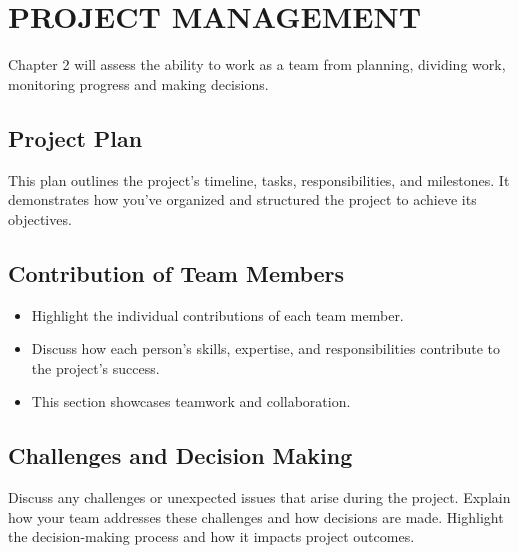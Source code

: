 

\chapter{PROJECT MANAGEMENT}

Chapter 2 will assess the ability to work as a team from planning, dividing work,
monitoring progress and making decisions.


\section{Project Plan}
This plan outlines the project’s timeline, tasks, responsibilities, and milestones. It demonstrates how you've organized and structured the project to achieve its objectives.


\section{Contribution of Team Members}
\begin{itemize}
\item Highlight the individual contributions of each team member.
\item Discuss how each person's skills, expertise, and responsibilities contribute to the project's success.
\item This section showcases teamwork and collaboration.
\end{itemize}


\section{Challenges and Decision Making}
Discuss any challenges or unexpected issues that arise during the project. Explain how your team addresses these challenges and how decisions are made. Highlight the decision-making process and how it impacts project outcomes.





